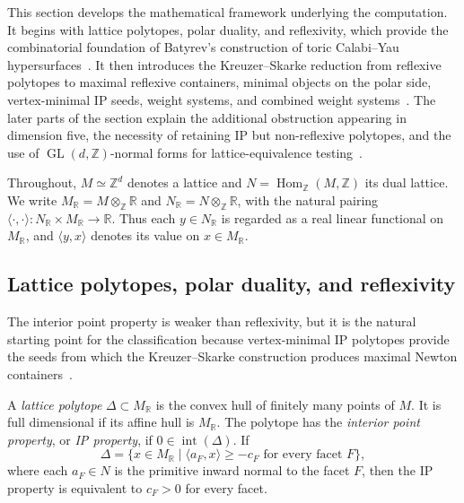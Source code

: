 \documentclass[appliedmath,article,submit,moreauthors]{Definitions/mdpi}
\newcommand{\Z}{\mathbb{Z}}
\newcommand{\GL}{\operatorname{GL}}
\newcommand{\RR}{\mathbb{R}}
\newcommand{\interior}{\operatorname{int}}
\begin{document}
This section develops the mathematical framework underlying the computation. It
begins with lattice polytopes, polar duality, and reflexivity, which provide the
combinatorial foundation of Batyrev's construction of toric Calabi--Yau
hypersurfaces~\cite{Batyrev1994}. It then introduces the Kreuzer--Skarke
reduction from reflexive polytopes to maximal reflexive containers, minimal
objects on the polar side, vertex-minimal IP seeds, weight systems, and combined
weight systems~\cite{KS97,KreuzerSkarke2000,KSFibrations2002}. The later parts
of the section explain the additional obstruction appearing in dimension five,
the necessity of retaining IP but non-reflexive polytopes, and the use of
\(\GL(d,\Z)\)-normal forms for lattice-equivalence
testing~\cite{Skarke1996,Scholler2019,PALP}.

Throughout, \(M\simeq\Z^d\) denotes a lattice and
\(N=\operatorname{Hom}_{\Z}(M,\Z)\) its dual lattice. We write
\(M_{\RR}=M\otimes_{\Z}\RR\) and \(N_{\RR}=N\otimes_{\Z}\RR\), with the natural
pairing \(\langle\cdot,\cdot\rangle\colon N_{\RR}\times M_{\RR}\to\RR\). Thus
each \(y\in N_{\RR}\) is regarded as a real linear functional on \(M_{\RR}\),
and \(\langle y,x\rangle\) denotes its value on \(x\in M_{\RR}\).

\subsection{Lattice polytopes, polar duality, and reflexivity}
\label{sec:math-reflexive}

The interior point property is weaker than reflexivity, but it is the natural
starting point for the classification because vertex-minimal IP polytopes
provide the seeds from which the Kreuzer--Skarke construction produces maximal
Newton containers~\cite{KS97,KSFibrations2002}.

\begin{Definition}
\label{def:lattice-polytope}
A \emph{lattice polytope} \(\Delta\subset M_{\RR}\) is the convex hull of
finitely many points of \(M\). It is full dimensional if its affine hull is
\(M_{\RR}\). The polytope has the \emph{interior point property}, or
\emph{IP property}, if \(0\in\interior(\Delta)\). If
\[
\Delta=\{x\in M_{\RR}\mid \langle a_F,x\rangle\geq-c_F
\text{ for every facet }F\},
\]
where each \(a_F\in N\) is the primitive inward normal to the facet \(F\), then
the IP property is equivalent to \(c_F>0\) for every facet.
\end{Definition}
\end{document}
